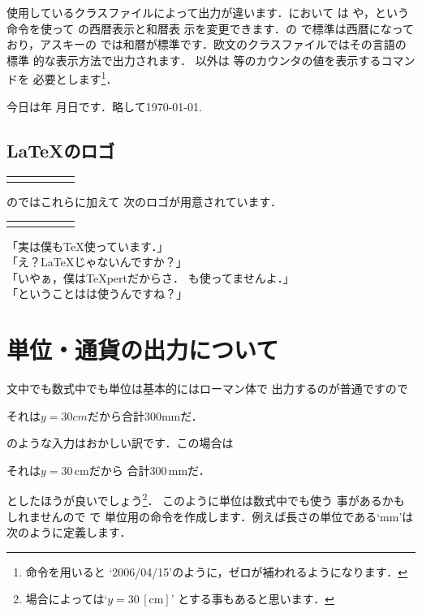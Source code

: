 %
%
使用しているクラスファイルによって出力が違います．において
は や，という命令を使って  の西暦表示と和暦表
示を変更できます．の
で標準は西暦になっており，アスキーの
では和暦が標準です．欧文のクラスファイルではその言語の標準
的な表示方法で出力されます．
 以外は  等のカウンタの値を表示するコマンドを
必要とします\footnote{ 命令を用いると
`2006/04/15'のように，ゼロが補われるようになります．}．
\begin{InOut}
今日は\number\year 年\number\month
月\number\day 日です．略して\today.
\end{InOut}

\subsection{{\protect\LaTeX}のロゴ}
\begin{Syntax}
\begin{tabular}{*3{l@{\space}l}}
 \C{TeX}   & \pp{\TeX} &
 \C{LaTeX} & \pp{\LaTeX} &
 \C{LaTeXe}& \pp{\LaTeXe} 
\end{tabular}
\end{Syntax}
のではこれらに加えて
次のロゴが用意されています．
\begin{Syntax}
\begin{tabular}{*3{l@{\space}l}}
 \C{pTeX}    & \pp{\pTeX}   &
 \C{pLaTeX}  & \pp{\pLaTeX} &
 \C{pLaTeXe} & \pp{\pLaTeXe}
\end{tabular}
\end{Syntax}
\begin{InOut}
「実は僕も{\TeX}使っています．」\\
「え？{\LaTeX}じゃないんですか？」\\
「いやぁ，僕は{\TeX pert}だからさ．
 {\LaTeXe}も使ってませんよ．」\\
「ということは{\pTeX}は使うんですね？」
\end{InOut}


\section{単位・通貨の出力について}
文中でも数式中でも単位は基本的にはローマン体で
出力するのが普通ですので
\begin{InOut}
それは$y=30cm$だから合計300mmだ．
\end{InOut}
のような入力はおかしい訳です．この場合は
\begin{InOut}
それは$y=30\,\mathrm{cm}$だから
合計300\,mmだ．
\end{InOut}
としたほうが良いでしょう\footnote{場合によっては`$y=30\,[\mathrm{cm}]$'
とする事もあると思います．}．
このように単位は数式中でも使う
事があるかもしれませんので で
単位用の命令を作成します．例えば長さの単位である`mm'は
次のように定義します．

